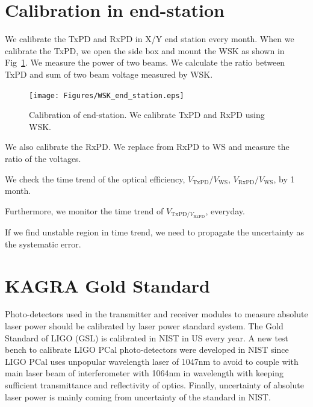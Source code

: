\section{Calibration in end-station}
We calibrate the TxPD and RxPD in X/Y end station every month. When we calibrate the TxPD, we open the side box and mount the WSK as shown in Fig~\ref{fig:WSK_end_station}. We measure the power of two beams. We calculate the ratio between TxPD and sum of two beam voltage measured by WSK. 


\begin{figure}
\begin{center}
\texttt{[image: Figures/WSK\_end\_station.eps]}
\caption{Calibration of end-station. We calibrate TxPD and RxPD using WSK.} 
\label{fig:WSK_end_station} 
\end{center}
\end{figure}

We also calibrate the RxPD. We replace from RxPD to WS and measure the ratio of the voltages. 

We check the time trend of the optical efficiency, $V_{\mathrm{TxPD}}/V_{\mathrm{WS}}$, $V_{\mathrm{RxPD}}/V_{\mathrm{WS}}$, by 1 month.

Furthermore, we monitor the time trend of $V_{\mathrm{TxPD}/V_{\mathrm{RxPD}}}$, everyday.

If we find unstable region in time trend, we need to propagate the uncertainty as the systematic error.

\section{KAGRA Gold Standard}
Photo-detectors used in the transmitter and receiver modules to measure absolute laser power should be calibrated by laser power standard system. The Gold Standard of LIGO (GSL) is calibrated in NIST in US every year. A new test bench to calibrate LIGO PCal photo-detectors were developed in NIST since LIGO PCal uses unpopular wavelength laser of 1047nm to avoid to couple with main laser beam of interferometer with 1064nm in wavelength with keeping sufficient transmittance and reflectivity of optics. Finally, uncertainty of absolute laser power is mainly coming from uncertainty of the standard in NIST. 

